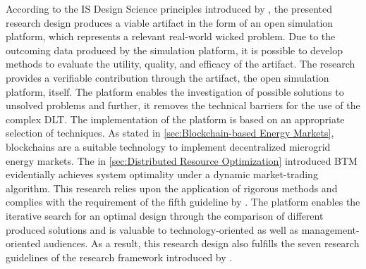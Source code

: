 According to the IS Design Science principles introduced by , 
the presented research design produces a viable artifact in the form of an open simulation platform, which represents a 
relevant real-world wicked problem. Due to the outcoming data produced by the simulation platform, 
it is possible to develop methods to evaluate the utility, quality, and efficacy of the artifact. 
The research provides a verifiable contribution through the artifact, the open simulation platform, itself. 
The platform enables the investigation of possible solutions to unsolved problems and further, 
it removes the technical barriers for the use of the complex DLT. 
The implementation of the platform is based on an appropriate selection of techniques. 
As stated in \ref{sec:Blockchain-based Energy Markets}, 
blockchains are a suitable technology to implement decentralized microgrid energy markets. 
The in \ref{sec:Distributed Resource Optimization} introduced BTM evidentially achieves system 
optimality under a dynamic market-trading algorithm. 
This research relies upon the application of rigorous methods and complies with the requirement 
of the fifth guideline by . 
The platform enables the iterative search for an optimal design through the comparison 
of different produced solutions and is valuable to technology-oriented as well as management-oriented 
audiences. As a result, this research design also fulfills the seven research guidelines of 
the research framework introduced by . 
